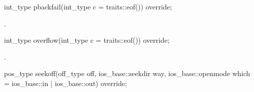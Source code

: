 \documentclass[ebook,11pt,article]{memoir}
\begin{document}
\begin{itemdecl}
int_type pbackfail(int_type c = traits::eof()) override;
\end{itemdecl}

\begin{itemdescr}
\pnum
\returns
{}.
\end{itemdescr}

\begin{itemdecl}
int_type overflow(int_type c = traits::eof()) override;
\end{itemdecl}

\begin{itemdescr}
\pnum
\returns
{}.

\end{itemdescr}

\begin{itemdecl}
pos_type seekoff(off_type off, ios_base::seekdir way,
                 ios_base::openmode which
                   = ios_base::in | ios_base::out) override;
\end{itemdecl}
\end{document}
